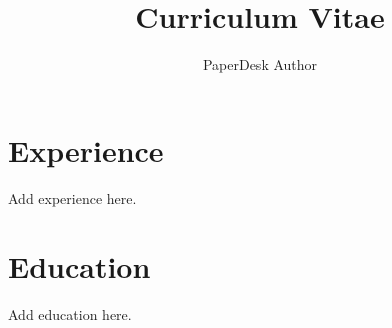 \documentclass{article}
\title{Curriculum Vitae}
\author{PaperDesk Author}
\begin{document}
\maketitle
\section*{Experience}
Add experience here.
\section*{Education}
Add education here.
\end{document}
